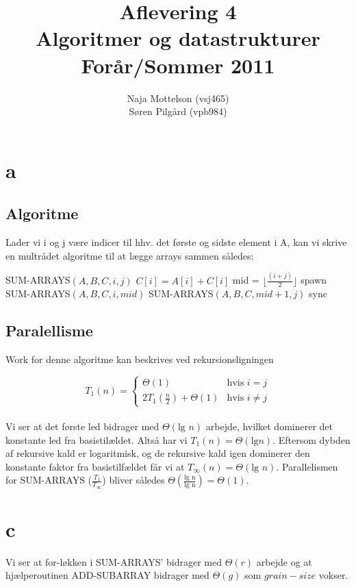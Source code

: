 \documentclass[10pt,a4paper,danish]{article}
\title{Aflevering 4 \\Algoritmer og datastrukturer\\Forår/Sommer 2011}
\author{Naja Mottelson (vsj465)\\Søren Pilgård (vpb984)}
\begin{document}
\maketitle
\newpage

\tableofcontents
\newpage

\section{a}
\subsection{Algoritme}
Lader vi i og j være indicer til hhv. det første og sidste element i A, kan vi
skrive en multrådet algoritme til at lægge arrays sammen således: 
\\

\begin{algorithmic}[1]
\STATE SUM-ARRAYS$(A, B, C, i, j)$
    \STATE $ C[i] = A[i] + C[i]$
\ELSE
    \STATE mid = $\lfloor \frac{(i + j)} 2 \rfloor$ 
    \STATE spawn SUM-ARRAYS$(A, B, C, i, mid)$
    \STATE SUM-ARRAYS$(A, B, C, mid + 1, j)$
	\STATE sync
\ENDIF
\end{algorithmic}

\subsection{Paralellisme}
Work for denne algoritme kan beskrives ved rekursionsligningen

$$
T_1(n) =
  \begin{cases}
    \Theta(1) & \text{hvis } i = j \\
   2T_1(\frac{n} {2}) + \Theta(1)& \text{hvis } i \neq j
  \end{cases}
$$
\\
Vi ser at det første led bidrager med $\Theta(\text{lg }n)$ arbejde, hvilket
dominerer det konstante led fra basistilældet. Altså har vi $T_1(n) =\Theta(\text{lg} n)$. 
Eftersom dybden af rekursive kald er logaritmisk, og de rekursive kald igen dominerer
den konstante faktor fra basistilfældet får vi at $T_\infty(n) = \Theta(\text{lg } n)$. 
Parallelismen for SUM-ARRAYS ($\frac{T_1} {T_\infty}$) bliver således $\Theta(\frac{\text{lg n}} {\text{lg n}}) = \Theta(1)$. 

\section{c}
Vi ser at for-løkken i SUM-ARRAYS' bidrager med $\Theta(r)$ arbejde og 
at hjælperoutinen ADD-SUBARRAY bidrager med $\Theta(g)$ som $grain-size$ vokser. 
\end{document}
